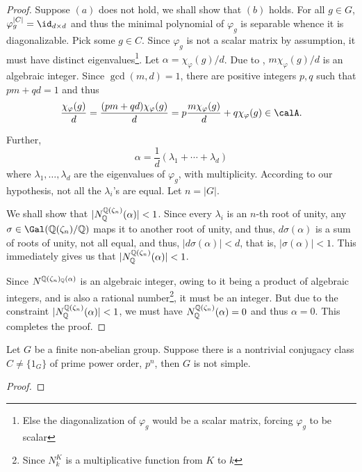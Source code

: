 \begin{proof}
    Suppose $(a)$ does not hold, we shall show that $(b)$ holds. For all $g\in G$, $\varphi_g^{|C|} = \id_{d\times d}$ and thus the minimal polynomial of $\varphi_g$ is separable whence it is diagonalizable. Pick some $g\in C$. Since $\varphi_g$ is not a scalar matrix by assumption, it must have distinct eigenvalues\footnote{Else the diagonalization of $\varphi_g$ would be a scalar matrix, forcing $\varphi_g$ to be scalar}. Let $\alpha = \chi_\varphi(g)/d$. Due to , $m\chi_\varphi(g)/d$ is an algebraic integer. Since $\gcd(m, d) = 1$, there are positive integers $p, q$ such that $pm + qd = 1$ and thus 
    \begin{equation*}
        \frac{\chi_\varphi(g)}{d} = \frac{(pm + qd)\chi_\varphi(g)}{d} = p\frac{m\chi_\varphi(g)}{d} + q\chi_\varphi(g)\in\calA.
    \end{equation*}

    Further, 
    \begin{equation*}
        \alpha = \frac{1}{d}(\lambda_1 + \cdots + \lambda_d)
    \end{equation*}
    where $\lambda_1,\ldots,\lambda_d$ are the eigenvalues of $\varphi_g$, with multiplicity. According to our hypothesis, not all the $\lambda_i$'s are equal. Let $n = |G|$. 
    
    We shall show that $|N^{\mathbb{Q}(\zeta_n)}_{\mathbb{Q}}(\alpha)| < 1$. Since every $\lambda_i$ is an $n$-th root of unity, any $\sigma\in\Gal(\Q(\zeta_n)/\Q)$ maps it to another root of unity, and thus, $d\sigma(\alpha)$ is a sum of roots of unity, not all equal, and thus, $|d\sigma(\alpha)| < d$, that is, $|\sigma(\alpha)| < 1$. This immediately gives us that $|N^{\mathbb{Q}(\zeta_n)}_{\mathbb{Q}}(\alpha)| < 1$.

    Since $N^{\mathbb{Q}(\zeta_n)_{\mathbb{Q}}(\alpha)}$ is an algebraic integer, owing to it being a product of algebraic integers, and is also a rational number\footnote{Since $N^K_k$ is a multiplicative function from $K$ to $k$}, it must be an integer. But due to the constraint $|N^{\mathbb{Q}(\zeta_n)}_{\mathbb{Q}}(\alpha)| < 1$, we must have $N^{\mathbb{Q}(\zeta_n)}_{\mathbb{Q}}(\alpha) = 0$ and thus $\alpha = 0$. This completes the proof.
\end{proof}

\begin{lemma}
    Let $G$ be a finite non-abelian group. Suppose there is a nontrivial conjugacy class $C\ne\{1_G\}$ of prime power order, $p^n$, then $G$ is not simple.
\end{lemma}
\begin{proof}
    
\end{proof}
